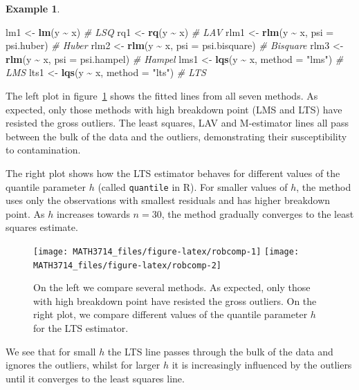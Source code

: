 \documentclass[
  a4paper,
]{article}
\newenvironment{Shaded}{\begin{snugshade}}{\end{snugshade}}
\newcommand{\AttributeTok}[1]{\textcolor[rgb]{0.13,0.29,0.53}{#1}}
\newcommand{\CommentTok}[1]{\textcolor[rgb]{0.56,0.35,0.01}{\textit{#1}}}
\newcommand{\FunctionTok}[1]{\textcolor[rgb]{0.13,0.29,0.53}{\textbf{#1}}}
\newcommand{\NormalTok}[1]{#1}
\newcommand{\OtherTok}[1]{\textcolor[rgb]{0.56,0.35,0.01}{#1}}
\newcommand{\SpecialCharTok}[1]{\textcolor[rgb]{0.81,0.36,0.00}{\textbf{#1}}}
\newcommand{\StringTok}[1]{\textcolor[rgb]{0.31,0.60,0.02}{#1}}
\theoremstyle{definition}
\theoremstyle{definition}
\newtheorem{example}{Example}[section]
\theoremstyle{definition}
\theoremstyle{definition}
\theoremstyle{remark}
\begin{document}
\begin{example}
\begin{Shaded}
\begin{Highlighting}[]
\NormalTok{lm1   }\OtherTok{\textless{}{-}} \FunctionTok{lm}\NormalTok{(y }\SpecialCharTok{\textasciitilde{}}\NormalTok{ x)                           }\CommentTok{\# LSQ}
\NormalTok{rq1   }\OtherTok{\textless{}{-}} \FunctionTok{rq}\NormalTok{(y }\SpecialCharTok{\textasciitilde{}}\NormalTok{ x)                           }\CommentTok{\# LAV}
\NormalTok{rlm1  }\OtherTok{\textless{}{-}} \FunctionTok{rlm}\NormalTok{(y }\SpecialCharTok{\textasciitilde{}}\NormalTok{ x, }\AttributeTok{psi =}\NormalTok{ psi.huber)         }\CommentTok{\# Huber}
\NormalTok{rlm2  }\OtherTok{\textless{}{-}} \FunctionTok{rlm}\NormalTok{(y }\SpecialCharTok{\textasciitilde{}}\NormalTok{ x, }\AttributeTok{psi =}\NormalTok{ psi.bisquare)      }\CommentTok{\# Bisquare}
\NormalTok{rlm3  }\OtherTok{\textless{}{-}} \FunctionTok{rlm}\NormalTok{(y }\SpecialCharTok{\textasciitilde{}}\NormalTok{ x, }\AttributeTok{psi =}\NormalTok{ psi.hampel)        }\CommentTok{\# Hampel}
\NormalTok{lms1  }\OtherTok{\textless{}{-}} \FunctionTok{lqs}\NormalTok{(y }\SpecialCharTok{\textasciitilde{}}\NormalTok{ x, }\AttributeTok{method =} \StringTok{"lms"}\NormalTok{)          }\CommentTok{\# LMS}
\NormalTok{lts1  }\OtherTok{\textless{}{-}} \FunctionTok{lqs}\NormalTok{(y }\SpecialCharTok{\textasciitilde{}}\NormalTok{ x, }\AttributeTok{method =} \StringTok{"lts"}\NormalTok{)          }\CommentTok{\# LTS}
\end{Highlighting}
\end{Shaded}

The left plot in figure~\ref{fig:robcomp} shows the fitted lines
from all seven methods. As expected, only those methods with high
breakdown point (LMS and LTS) have resisted the gross outliers.
The least squares, LAV and M-estimator lines all pass between the
bulk of the data and the outliers, demonstrating their susceptibility
to contamination.

The right plot shows how the LTS estimator behaves for different
values of the quantile parameter \(h\) (called \texttt{quantile} in R).
For smaller values of \(h\), the method uses only the observations
with smallest residuals and has higher breakdown point. As \(h\)
increases towards \(n = 30\), the method gradually converges to the
least squares estimate.

\begin{figure}
\texttt{[image: MATH3714\_files/figure-latex/robcomp-1]} \texttt{[image: MATH3714\_files/figure-latex/robcomp-2]} \caption{On the left we compare several methods. As expected, only those with high breakdown point have resisted the gross outliers. On the right plot, we compare different values of the quantile parameter $h$ for the LTS estimator.}\label{fig:robcomp}
\end{figure}

We see that for small \(h\) the LTS line passes through the bulk of the
data and ignores the outliers, whilst for larger \(h\) it is increasingly
influenced by the outliers until it converges to the least squares line.
\end{example}
\end{document}
